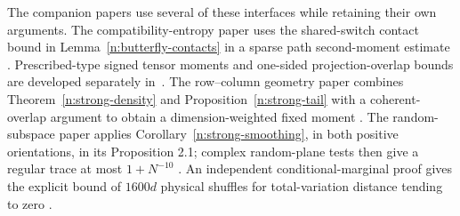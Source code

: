 The companion papers use several of these interfaces while retaining
their own arguments. The compatibility-entropy paper uses the
shared-switch contact bound in Lemma~\ref{n:butterfly-contacts} in a
sparse path second-moment estimate
\cite[Lemma 3.1]{CompatibilityEntropy2026}. Prescribed-type signed
tensor moments and one-sided projection-overlap bounds are developed
separately in~\cite[Theorems 1.1 and 3.2]{SignedTensorBudgets2026}.
The row--column geometry paper combines Theorem~\ref{n:strong-density}
and Proposition~\ref{n:strong-tail} with a coherent-overlap argument to
obtain a dimension-weighted fixed moment
\cite[Theorem 10.1]{RowColumnGeometry2026}. The random-subspace paper
applies Corollary~\ref{n:strong-smoothing}, in both positive
orientations, in its Proposition 2.1; complex random-plane tests then
give a regular trace at most $1+N^{-10}$
\cite[Theorem 1.1]{RandomSubspace2026}. An independent
conditional-marginal proof gives the explicit bound of $1600d$
physical shuffles for total-variation distance tending to zero
\cite[Theorem 1.1]{OptimalThorpMixing2026}.
